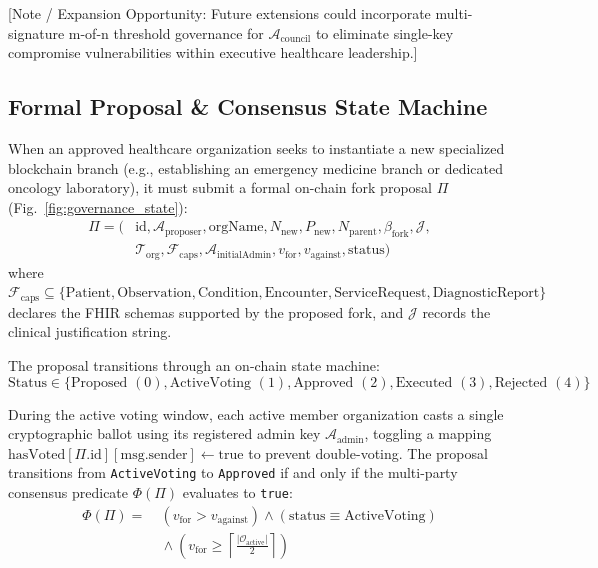 [Note / Expansion Opportunity: Future extensions could incorporate multi-signature m-of-n threshold governance for $\mathcal{A}_{\text{council}}$ to eliminate single-key compromise vulnerabilities within executive healthcare leadership.]

\subsection{Formal Proposal \& Consensus State Machine}
When an approved healthcare organization seeks to instantiate a new specialized blockchain branch (e.g., establishing an emergency medicine branch or dedicated oncology laboratory), it must submit a formal on-chain fork proposal $\Pi$ (Fig.~\ref{fig:governance_state}):
\begin{equation}
\begin{aligned}
\Pi = (& \text{id}, \mathcal{A}_{\text{proposer}}, \text{orgName}, N_{\text{new}}, P_{\text{new}}, N_{\text{parent}}, \beta_{\text{fork}}, \mathcal{J}, \\
       & \mathcal{T}_{\text{org}}, \mathcal{F}_{\text{caps}}, \mathcal{A}_{\text{initialAdmin}}, v_{\text{for}}, v_{\text{against}}, \text{status} )
\end{aligned}
\end{equation}
where $\mathcal{F}_{\text{caps}} \subseteq \{\text{Patient}, \text{Observation}, \text{Condition}, \text{Encounter}, \text{ServiceRequest}, \text{DiagnosticReport}\}$ declares the FHIR schemas supported by the proposed fork, and $\mathcal{J}$ records the clinical justification string.

The proposal transitions through an on-chain state machine:
\begin{equation}
\text{Status} \in \{\text{Proposed } (0), \text{ActiveVoting } (1), \text{Approved } (2), \text{Executed } (3), \text{Rejected } (4)\}
\end{equation}

During the active voting window, each active member organization casts a single cryptographic ballot using its registered admin key $\mathcal{A}_{\text{admin}}$, toggling a mapping $\text{hasVoted}[\Pi.\text{id}][\text{msg.sender}] \leftarrow \text{true}$ to prevent double-voting. The proposal transitions from \texttt{ActiveVoting} to \texttt{Approved} if and only if the multi-party consensus predicate $\Phi(\Pi)$ evaluates to \texttt{true}:
\begin{equation}
\label{eq:consensus_predicate}
\begin{aligned}
\Phi(\Pi) = &\ \left( v_{\text{for}} > v_{\text{against}} \right) \land (\text{status} \equiv \text{ActiveVoting}) \\
            &\ \land \left( v_{\text{for}} \ge \left\lceil \frac{|\mathcal{O}_{\text{active}}|}{2} \right\rceil \right)
\end{aligned}
\end{equation}

